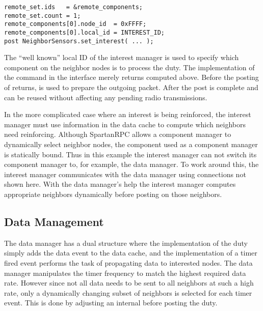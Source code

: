 \begin{Verbatim}
remote_set.ids   = &remote_components;
remote_set.count = 1;
remote_components[0].node_id  = 0xFFFF;
remote_components[0].local_id = INTEREST_ID;
post NeighborSensors.set_interest( ... );
\end{Verbatim}
\vspace{0.3em}

The ``well known'' local ID of the interest manager is used to specify which component on the
neighbor nodes is to process the duty. The implementation of the  command in the
 interface merely returns  computed above. Before the
posting of  returns,  is used to prepare the outgoing
packet. After the post is complete  and  can be
reused without affecting any pending radio transmissions.

In the more complicated case where an interest is being reinforced, the interest manager must
use information in the data cache to compute which neighbors need reinforcing. Although
SpartanRPC allows a component manager to dynamically select neighbor nodes, the component used
as a component manager is statically bound. Thus in this example the interest manager can not
switch its component manager to, for example, the data manager. To work around this, the
interest manager communicates with the data manager using connections not shown here. With the
data manager's help the interest manager computes appropriate neighbors dynamically before
posting  on those neighbors.

\subsection{Data Management}

The data manager has a dual structure where the implementation of the  duty
simply adds the data event to the data cache, and the implementation of a timer fired event
performs the task of propagating data to interested nodes. The data manager manipulates the
timer frequency to match the highest required data rate. However since not all data needs to be
sent to all neighbors at such a high rate, only a dynamically changing subset of neighbors is
selected for each timer event. This is done by adjusting an internal 
before posting the  duty.

